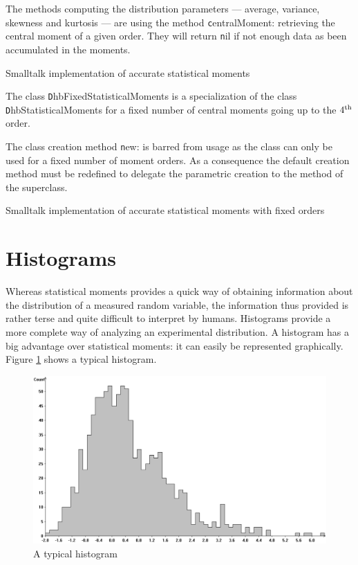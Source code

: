 The methods computing the distribution parameters --- average,
variance, skewness and kurtosis --- are using the method {\texttt
centralMoment:} retrieving the central moment of a given order.
They will return {\texttt nil} if not enough data as been accumulated
in the moments.

\begin{listing} Smalltalk implementation of accurate statistical moments \label{ls:genmoments}

\end{listing}

The class {\texttt DhbFixedStatisticalMoments} is a specialization of
the class {\texttt DhbStatisticalMoments} for a fixed number of
central moments going up to the $4^{\mathop{\textrm{th}}}$ order.

The class creation method {\texttt new:} is barred from usage as the
class can only be used for a fixed number of moment orders. As a
consequence the default creation method must be redefined to
delegate the parametric creation to the method of the superclass.

\begin{listing} Smalltalk implementation of accurate statistical moments with fixed orders \label{ls:fixedmoments}

\end{listing}

\section{Histograms}
\label{sec:histogram} Whereas statistical moments provides a quick
way of obtaining information about the distribution of a measured
random variable, the information thus provided is rather terse and
quite difficult to interpret by humans. Histograms provide a more
complete way of analyzing an experimental distribution. A
histogram has a big advantage over statistical moments: it can
easily be represented graphically. Figure \ref{fig:histogram}
shows a typical histogram.
\begin{figure}
\centering\includegraphics[width=12cm]{Figures/Histogram}
\caption{A typical histogram}\label{fig:histogram}
\end{figure}

